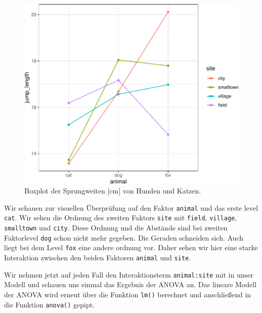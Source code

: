 \documentclass[
  letterpaper,
  DIV=11,
  oneside]{scrreport}
\begin{document}
\begin{figure}[H]

{\centering \includegraphics{./stat-tests-anova_files/figure-pdf/fig-interact-anova-1-1.pdf}

}

\caption{\label{fig-interact-anova-1}Boxplot der Sprungweiten {[}cm{]}
von Hunden und Katzen.}

\end{figure}

{}

Wir schauen zur visuellen Überprüfung auf den Faktor \texttt{animal} und
das erste level \texttt{cat}. Wir sehen die Ordnung des zweiten Faktors
\texttt{site} mit \texttt{field}, \texttt{village}, \texttt{smalltown}
und \texttt{city}. Diese Ordnung und die Abstände sind bei zweiten
Faktorlevel \texttt{dog} schon nicht mehr gegeben. Die Geraden schneiden
sich. Auch liegt bei dem Level \texttt{fox} eine andere ordnung vor.
Daher sehen wir hier eine starke Interaktion zwischen den beiden
Faktoren \texttt{animal} und \texttt{site}.

Wir nehmen jetzt auf jeden Fall den Interaktionsterm
\texttt{animal:site} mit in unser Modell und schauen uns einmal das
Ergebnis der ANOVA an. Das lineare Modell der ANOVA wird erneut über die
Funktion \texttt{lm()} berechnet und anschließend in die Funktion
\texttt{anova()} gepipt.
\end{document}
